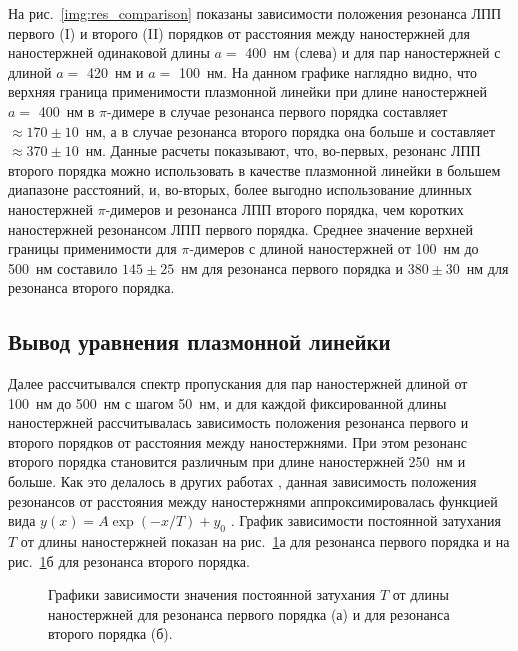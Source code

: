 На рис.~\ref{img:res_comparison} показаны зависимости положения резонанса ЛПП первого (I) и второго (II) порядков от расстояния между наностержней для наностержней одинаковой длины $ a = $ 400~нм (слева) и для пар наностержней с длиной $ a = $ 420~нм и $ a = $ 100~нм. На данном графике наглядно видно, что верхняя граница применимости плазмонной линейки при длине наностержней $ a = $ 400~нм в $ \pi $-димере в случае резонанса первого порядка составляет $ \approx 170 \pm 10 $~нм, а в случае резонанса второго порядка она больше и составляет $ \approx 370 \pm 10 $~нм. Данные расчеты показывают, что, во-первых, резонанс ЛПП второго порядка можно использовать в качестве плазмонной линейки в большем диапазоне расстояний, и, во-вторых, более выгодно использование длинных наностержней $ \pi $-димеров и резонанса ЛПП второго порядка, чем коротких наностержней резонансом ЛПП первого порядка. Среднее значение верхней границы применимости для $ \pi $-димеров с длиной наностержней от 100~нм до 500~нм составило $ 145 \pm 25 $~нм для резонанса первого порядка и $ 380 \pm 30 $~нм для резонанса второго порядка.


\subsection{Вывод уравнения плазмонной линейки}

Далее рассчитывался спектр пропускания для пар наностержней длиной от 100~нм до 500~нм с шагом 50~нм, и для каждой фиксированной длины наностержней рассчитывалась зависимость положения резонанса первого и второго порядков от расстояния между наностержнями. При этом резонанс второго порядка становится различным при длине наностержней 250~нм и больше. Как это делалось в других работах \cite{plasonrulereq, bioplasmonruler3, nanoprism, nanorods}, данная зависимость положения резонансов от расстояния между наностержнями аппроксимировалась функцией вида $ y(x) = A \exp (-x/ T ) + y_0 $ . График зависимости постоянной затухания $ T $ от длины наностержней показан на рис.~\ref{img:expdecay}а для резонанса первого порядка и на рис.~\ref{img:expdecay}б для резонанса второго порядка.

\begin{figure}
\caption{Графики зависимости значения постоянной затухания $ T $ от длины наностержней для резонанса первого порядка (а) и для резонанса второго порядка (б).}
\label{img:expdecay}
\end{figure}

